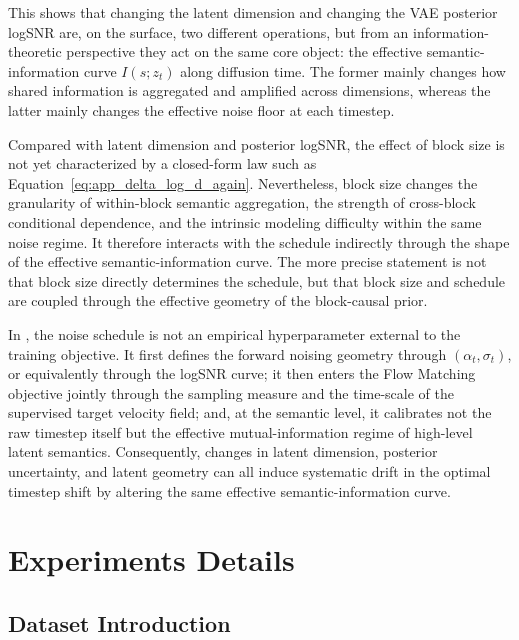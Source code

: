 This shows that changing the latent dimension and changing the VAE posterior logSNR are, on the surface, two different operations, but from an information-theoretic perspective they act on the same core object: the effective semantic-information curve $I(s;z_t)$ along diffusion time. The former mainly changes how shared information is aggregated and amplified across dimensions, whereas the latter mainly changes the effective noise floor at each timestep.

\begin{remark}
\label{rem:app_block_size_role}
Compared with latent dimension and posterior logSNR, the effect of block size is not yet characterized by a closed-form law such as Equation~\eqref{eq:app_delta_log_d_again}. Nevertheless, block size changes the granularity of within-block semantic aggregation, the strength of cross-block conditional dependence, and the intrinsic modeling difficulty within the same noise regime. It therefore interacts with the schedule indirectly through the shape of the effective semantic-information curve. The more precise statement is not that block size directly determines the schedule, but that block size and schedule are coupled through the effective geometry of the block-causal prior.
\end{remark}

\begin{remark}[Summary]
\label{rem:app_noise_schedule_summary}
In \method, the noise schedule is not an empirical hyperparameter external to the training objective. It first defines the forward noising geometry through $(\alpha_t,\sigma_t)$, or equivalently through the logSNR curve; it then enters the Flow Matching objective jointly through the sampling measure and the time-scale of the supervised target velocity field; and, at the semantic level, it calibrates not the raw timestep itself but the effective mutual-information regime of high-level latent semantics. Consequently, changes in latent dimension, posterior uncertainty, and latent geometry can all induce systematic drift in the optimal timestep shift by altering the same effective semantic-information curve.
\end{remark}

\section{Experiments Details}

\subsection{Dataset Introduction}
\label{app:dataset}

